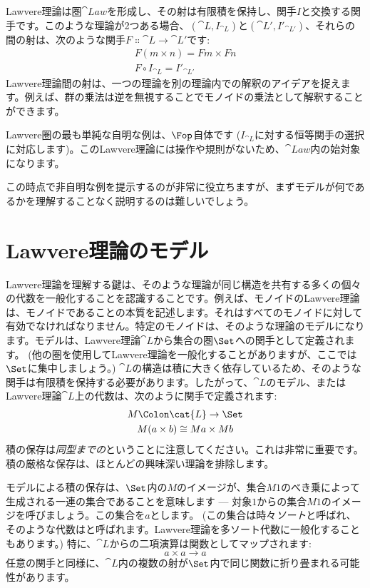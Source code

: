 Lawvere理論は圏$\cat{Law}$を形成し、その射は有限積を保持し、関手$I$と交換する関手です。このような理論が2つある場合、$(\cat{L}, I_{\cat{L}})$と$(\cat{L'}, I'_{\cat{L'}})$、それらの間の射は、次のような関手$F \Colon \cat{L} \to \cat{L'}$です: 
\begin{gather*}
  F (m \times n) = F m \times F n \\
  F \circ I_{\cat{L}} = I'_{\cat{L'}}
\end{gather*}
Lawvere理論間の射は、一つの理論を別の理論内での解釈のアイデアを捉えます。例えば、群の乗法は逆を無視することでモノイドの乗法として解釈することができます。

Lawvere圏の最も単純な自明な例は、$\Fop$自体です ($I_{\cat{L}}$に対する恒等関手の選択に対応します)。このLawvere理論には操作や規則がないため、$\cat{Law}$内の始対象になります。

この時点で非自明な例を提示するのが非常に役立ちますが、まずモデルが何であるかを理解することなく説明するのは難しいでしょう。

\section{Lawvere理論のモデル}

Lawvere理論を理解する鍵は、そのような理論が同じ構造を共有する多くの個々の代数を一般化することを認識することです。例えば、モノイドのLawvere理論は、モノイドであることの本質を記述します。それはすべてのモノイドに対して有効でなければなりません。特定のモノイドは、そのような理論のモデルになります。モデルは、Lawvere理論$\cat{L}$から集合の圏$\Set$への関手として定義されます。 (他の圏を使用してLawvere理論を一般化することがありますが、ここでは$\Set$に集中しましょう。) $\cat{L}$の構造は積に大きく依存しているため、そのような関手は有限積を保持する必要があります。したがって、$\cat{L}$のモデル、またはLawvere理論$\cat{L}$上の代数は、次のように関手で定義されます: 
\begin{gather*}
  M \Colon \cat{L} \to \Set \\
  M (a \times b) \cong M a \times M b
\end{gather*}
積の保存は\emph{同型までの}ということに注意してください。これは非常に重要です。積の厳格な保存は、ほとんどの興味深い理論を排除します。

モデルによる積の保存は、$\Set$内の$M$のイメージが、集合$M 1$のべき乗によって生成される一連の集合であることを意味します --- 対象$1$からの集合$M 1$のイメージを呼びましょう。この集合を$a$とします。 (この集合は時々\emph{ソート}と呼ばれ、そのような代数はと呼ばれます。Lawvere理論を多ソート代数に一般化することもあります。) 特に、$\cat{L}$からの二項演算は関数としてマップされます: 
\[a \times a \to a\]
任意の関手と同様に、$\cat{L}$内の複数の射が$\Set$内で同じ関数に折り畳まれる可能性があります。

